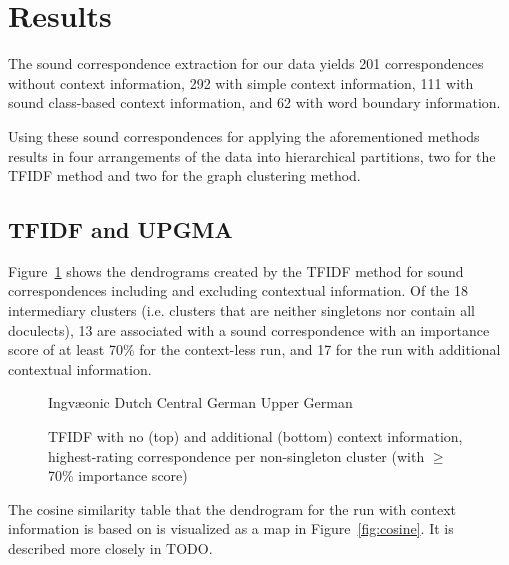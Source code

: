\documentclass[a4paper]{article}
\def\upper{\color{red}\FilledBigTriangleUp}
\def\central{\color{Dandelion}\FilledBigSquare}
\def\dutch{\color{ForestGreen}\FilledBigCircle}
\def\ingv{\color{Blue}\BigCircle}
\begin{document}
\section{Results}
\label{sec:results}

The sound correspondence extraction for our data
yields 201 correspondences without context information,
292 with simple context information,
111 with sound class-based context information,
and 62 with word boundary information.

Using these sound correspondences for
applying the aforementioned methods results in
four arrangements of the data into hierarchical partitions,
two for the TFIDF method and two for the graph clustering method.

\subsection{TFIDF and UPGMA}

Figure~\ref{fig:tfidf-dendrograms} shows the dendrograms
created by the TFIDF method for sound correspondences
including and excluding contextual information.
Of the 18 intermediary clusters
(i.e. clusters that are neither singletons nor contain all doculects),
13 are associated with a sound correspondence with an importance score of at least 70\% for the context-less run,
and 17 for the run with additional contextual information.

\begin{figure}[h]


\vspace{0.3em}
\begin{center}
{\ingv} Ingv\ae{}onic \hspace{1em}
{\dutch} Dutch \hspace{1em}
{\central} Central German \hspace{1em}
{\upper} Upper German
\end{center}
\caption{TFIDF with no (top) and additional (bottom) context information, highest-rating correspondence per non-singleton cluster (with $\geq$70\% importance score)}
\label{fig:tfidf-dendrograms}
\end{figure}

The cosine similarity table that the dendrogram
for the run with context information is based on
is visualized as a map in Figure~\ref{fig:cosine}.
It is described more closely in TODO.
\end{document}
